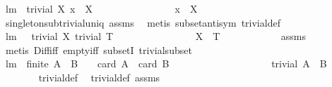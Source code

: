 \begin{isabellebody}
{\isafoldproof}%
%
\isadelimproof
\isanewline
%
\endisadelimproof
\isanewline
{}\isamarkupfalse%
\ lm{}{}{\isacharcolon}\ \ {\isachardoublequoteopen}trivial\ X{\isachardoublequoteclose}\ {\isachardoublequoteopen}{\isacharbraceleft}x{\isacharbraceright}\ {\isasymsubseteq}\ X{\isachardoublequoteclose}\ \isanewline
\ \ \ \ \ \ \ \ \ \ \ \ \ \ \ {\isachardoublequoteopen}{\isacharbraceleft}x{\isacharbraceright}\ {\isacharequal}\ X{\isachardoublequoteclose}\ \isanewline
%
\isadelimproof
\ \ \ \ \ \ %
\endisadelimproof
%
\isatagproof
{}\isamarkupfalse%
\ singleton{\isacharunderscore}sub{\isacharunderscore}trivial{\isacharunderscore}uniq\ assms\ \isamarkupfalse%
\ {\isacharparenleft}metis\ subset{\isacharunderscore}antisym\ trivial{\isacharunderscore}def{\isacharparenright}%
\endisatagproof
{\isafoldproof}%
%
\isadelimproof
\isanewline
%
\endisadelimproof
\isanewline
{}\isamarkupfalse%
\ lm{}{}{\isacharcolon}\ \ {\isachardoublequoteopen}{\isasymnot}\ trivial\ X{\isachardoublequoteclose}\ {\isachardoublequoteopen}trivial\ T{\isachardoublequoteclose}\ \isanewline
\ \ \ \ \ \ \ \ \ \ \ \ \ \ \ {\isachardoublequoteopen}X\ {\isacharminus}\ T\ \ {\isasymnoteq}\ \ {\isacharbraceleft}{\isacharbraceright}{\isachardoublequoteclose}\isanewline
%
\isadelimproof
\ \ \ \ \ \ %
\endisadelimproof
%
\isatagproof
{}\isamarkupfalse%
\ assms\ \isamarkupfalse%
\ {\isacharparenleft}metis\ Diff{\isacharunderscore}iff\ empty{\isacharunderscore}iff\ subsetI\ trivial{\isacharunderscore}subset{\isacharparenright}%
\endisatagproof
{\isafoldproof}%
%
\isadelimproof
\isanewline
%
\endisadelimproof
\isanewline
{}\isamarkupfalse%
\ lm{}{}{\isacharcolon}\ \ {\isachardoublequoteopen}{\isacharparenleft}finite\ {\isacharparenleft}A\ {\isasymtimes}\ B{\isacharparenright}\ \ {\isacharampersand}\ \ card\ A\ {\isacharasterisk}\ {\isacharparenleft}card\ B{\isacharparenright}\ {\isasymle}\ {}{\isacharparenright}{\isachardoublequoteclose}\ \isanewline
\ \ \ \ \ \ \ \ \ \ \ \ \ \ \ \ \ {\isachardoublequoteopen}trivial\ {\isacharparenleft}A\ {\isasymtimes}\ B{\isacharparenright}{\isachardoublequoteclose}\ \isanewline
%
\isadelimproof
\ \ \ \ \ \ %
\endisadelimproof
%
\isatagproof
{}\isamarkupfalse%
\ trivial{\isacharunderscore}def\ \isamarkupfalse%
\ trivial{\isacharunderscore}def\ assms\ \isamarkupfalse%

\end{isabellebody}
